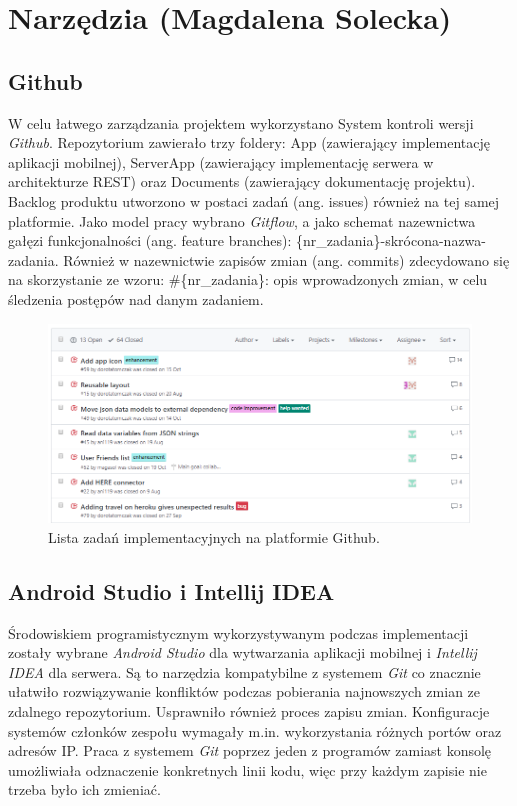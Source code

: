 \documentclass[10pt,twoside,a4paper]{report}
\begin{document}
\section{Narzędzia (Magdalena Solecka)}
\subsection{Github}
\par W celu łatwego zarządzania projektem wykorzystano System kontroli wersji \textit{Github}\cite{github}. Repozytorium zawierało trzy foldery: App (zawierający implementację aplikacji mobilnej), ServerApp (zawierający implementację serwera w architekturze REST) oraz Documents (zawierający dokumentację projektu). Backlog produktu utworzono w postaci zadań (ang. issues) również na tej samej platformie.  Jako model pracy wybrano \textit{Gitflow}, a jako schemat nazewnictwa gałęzi funkcjonalności (ang. feature branches): \{nr\_zadania\}-skrócona-nazwa-zadania. Również w nazewnictwie zapisów zmian (ang. commits) zdecydowano się na skorzystanie ze wzoru: \#\{nr\_zadania\}: opis wprowadzonych zmian, w celu śledzenia postępów nad danym zadaniem.

\begin{figure}[h]
\centering
\includegraphics[width=\linewidth]{github}
\caption{Lista zadań implementacyjnych na platformie Github.}
\label{fig:github}
\end{figure}
\FloatBarrier

\subsection{Android Studio i Intellij IDEA}
\par Środowiskiem programistycznym wykorzystywanym podczas implementacji zostały wybrane \textit{Android Studio} dla wytwarzania aplikacji mobilnej i \textit{Intellij IDEA} dla serwera. Są to narzędzia kompatybilne z systemem \textit{Git} co znacznie ułatwiło rozwiązywanie konfliktów podczas pobierania najnowszych zmian ze zdalnego repozytorium. Usprawniło również proces zapisu zmian. Konfiguracje systemów członków zespołu wymagały m.in. wykorzystania różnych portów oraz adresów IP. Praca z systemem \textit{Git} poprzez jeden z programów zamiast konsolę umożliwiała odznaczenie konkretnych linii kodu, więc przy każdym zapisie nie trzeba było ich zmieniać.
\end{document}
